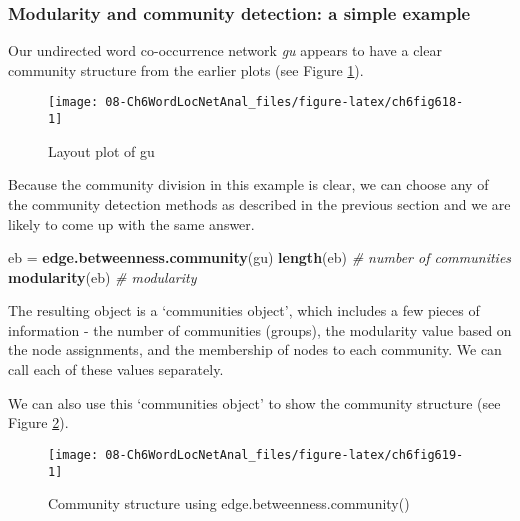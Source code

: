 \documentclass[
]{article}
\newenvironment{Shaded}{\begin{snugshade}}{\end{snugshade}}
\newcommand{\CommentTok}[1]{\textcolor[rgb]{0.56,0.35,0.01}{\textit{#1}}}
\newcommand{\FunctionTok}[1]{\textcolor[rgb]{0.13,0.29,0.53}{\textbf{#1}}}
\newcommand{\NormalTok}[1]{#1}
\newcommand{\OtherTok}[1]{\textcolor[rgb]{0.56,0.35,0.01}{#1}}
\begin{document}
\hypertarget{modularity-and-community-detection-a-simple-example}{%
\subsubsection{Modularity and community detection: a simple example}\label{modularity-and-community-detection-a-simple-example}}

Our undirected word co-occurrence network \emph{gu} appears to have a clear community structure from the earlier plots (see Figure \ref{fig:ch6fig618}).

\begin{figure}

{\centering \texttt{[image: 08-Ch6WordLocNetAnal\_files/figure-latex/ch6fig618-1]} 

}

\caption{Layout plot of gu}\label{fig:ch6fig618}
\end{figure}

Because the community division in this example is clear, we can choose any of the community detection methods as described in the previous section and we are likely to come up with the same answer.

\footnotesize

\begin{Shaded}
\begin{Highlighting}[]
\NormalTok{eb }\OtherTok{=} \FunctionTok{edge.betweenness.community}\NormalTok{(gu) }
\FunctionTok{length}\NormalTok{(eb) }\CommentTok{\# number of communities}
\FunctionTok{modularity}\NormalTok{(eb) }\CommentTok{\# modularity}
\end{Highlighting}
\end{Shaded}

\normalsize

The resulting object is a `communities object', which includes a few pieces of information - the number of communities (groups), the modularity value based on the node assignments, and the membership of nodes to each community. We can call each of these values separately.

We can also use this `communities object' to show the community structure (see Figure \ref{fig:ch6fig619}).

\begin{figure}

{\centering \texttt{[image: 08-Ch6WordLocNetAnal\_files/figure-latex/ch6fig619-1]} 

}

\caption{Community structure using edge.betweenness.community()}\label{fig:ch6fig619}
\end{figure}
\end{document}
